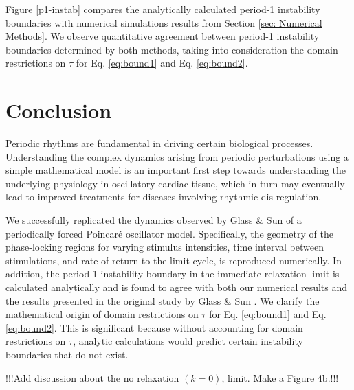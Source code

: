 Figure \ref{p1-instab} compares the analytically calculated period-1 instability boundaries with numerical simulations results from Section \ref{sec: Numerical Methods}. We observe quantitative agreement between period-1 instability boundaries determined by both methods, taking into consideration the domain restrictions on $\tau$ for Eq. \ref{eq:bound1} and Eq. \ref{eq:bound2}.

\section{Conclusion}

Periodic rhythms are fundamental in driving certain biological processes. Understanding the complex dynamics arising from periodic perturbations using a simple mathematical model is an important first step towards understanding the underlying physiology in oscillatory cardiac tissue, which in turn may eventually lead to improved treatments for diseases involving rhythmic dis-regulation.

We successfully replicated the dynamics observed by Glass \& Sun \supercite{GLASS1994} of a periodically forced Poincaré oscillator model. Specifically, the geometry of the phase-locking regions for varying stimulus intensities, time interval between stimulations, and rate of return to the limit cycle, is reproduced numerically. In addition, the period-1 instability boundary in the immediate relaxation limit is calculated analytically and is found to agree with both our numerical results and the results presented in the original study by Glass \& Sun \supercite{GLASS1994}. We clarify the mathematical origin of domain restrictions on $\tau$ for Eq. \ref{eq:bound1} and Eq. \ref{eq:bound2}. This is significant because without accounting for domain restrictions on $\tau$, analytic calculations would predict certain instability boundaries that do not exist.

!!!Add discussion about the no relaxation $(k=0)$, limit. Make a Figure 4b.!!!
